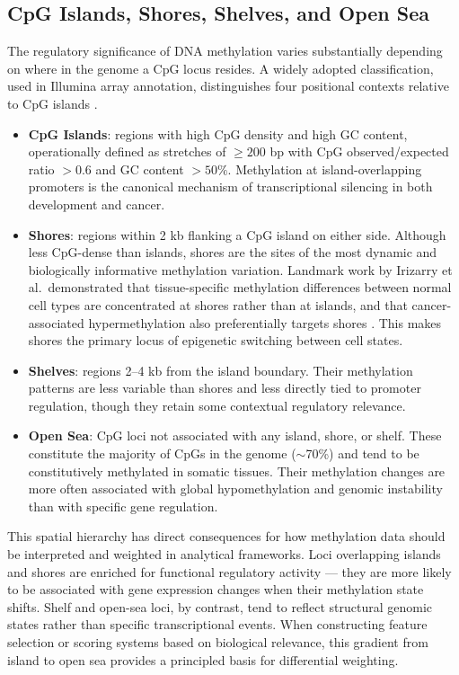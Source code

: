 \subsection{CpG Islands, Shores, Shelves, and Open Sea}

The regulatory significance of DNA methylation varies substantially depending
on where in the genome a CpG locus resides. A widely adopted classification,
used in Illumina array annotation, distinguishes four positional contexts
relative to CpG islands \cite{Irizarry2009}.
\begin{itemize}[label=--]
    \item \textbf{CpG Islands}: regions with high CpG density and high
    GC content, operationally defined as stretches of $\geq 200$ bp with
    CpG observed/expected ratio $> 0.6$ and GC content $> 50\%$.
    Methylation at island-overlapping promoters is the canonical mechanism
    of transcriptional silencing in both development and cancer.

    \item \textbf{Shores}: regions within 2 kb flanking a CpG island on
    either side. Although less CpG-dense than islands, shores are the sites
    of the most dynamic and biologically informative methylation variation.
    Landmark work by Irizarry et al.\ demonstrated that tissue-specific
    methylation differences between normal cell types are concentrated at
    shores rather than at islands, and that cancer-associated hypermethylation
    also preferentially targets shores \cite{Irizarry2009}. This makes shores
    the primary locus of epigenetic switching between cell states.

    \item \textbf{Shelves}: regions 2–4 kb from the island boundary. Their
    methylation patterns are less variable than shores and less directly tied
    to promoter regulation, though they retain some contextual regulatory
    relevance.

    \item \textbf{Open Sea}: CpG loci not associated with any island, shore,
    or shelf. These constitute the majority of CpGs in the genome ($\sim$70\%)
    and tend to be constitutively methylated in somatic tissues. Their
    methylation changes are more often associated with global hypomethylation
    and genomic instability than with specific gene regulation.
\end{itemize}

This spatial hierarchy has direct consequences for how methylation data
should be interpreted and weighted in analytical frameworks. Loci overlapping
islands and shores are enriched for functional regulatory activity — they are
more likely to be associated with gene expression changes when their methylation
state shifts. Shelf and open-sea loci, by contrast, tend to reflect structural
genomic states rather than specific transcriptional events. When constructing
feature selection or scoring systems based on biological relevance, this gradient
from island to open sea provides a principled basis for differential weighting.

